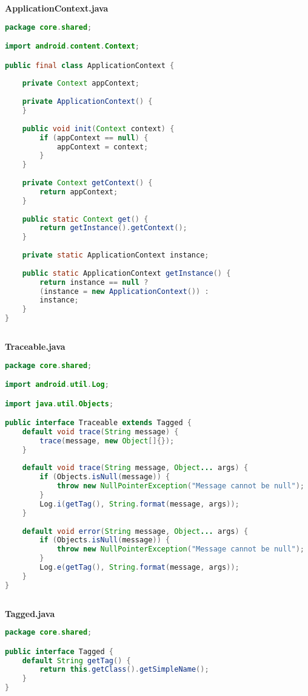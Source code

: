 \textbf{ApplicationContext.java}
\begin{lstlisting}[language=Java]
package core.shared;

import android.content.Context;

public final class ApplicationContext {
	
	private Context appContext;
	
	private ApplicationContext() {
	}
	
	public void init(Context context) {
		if (appContext == null) {
			appContext = context;
		}
	}
	
	private Context getContext() {
		return appContext;
	}
	
	public static Context get() {
		return getInstance().getContext();
	}
	
	private static ApplicationContext instance;
	
	public static ApplicationContext getInstance() {
		return instance == null ?
		(instance = new ApplicationContext()) :
		instance;
	}
}
	
\end{lstlisting}

\textbf{Traceable.java}
\begin{lstlisting}[language=Java]
package core.shared;

import android.util.Log;

import java.util.Objects;

public interface Traceable extends Tagged {
	default void trace(String message) {
		trace(message, new Object[]{});
	}
	
	default void trace(String message, Object... args) {
		if (Objects.isNull(message)) {
			throw new NullPointerException("Message cannot be null");
		}
		Log.i(getTag(), String.format(message, args));
	}
	
	default void error(String message, Object... args) {
		if (Objects.isNull(message)) {
			throw new NullPointerException("Message cannot be null");
		}
		Log.e(getTag(), String.format(message, args));
	}
}
	
\end{lstlisting}

\textbf{Tagged.java}
\begin{lstlisting}[language=Java]
package core.shared;

public interface Tagged {
	default String getTag() {
		return this.getClass().getSimpleName();
	}
}	
\end{lstlisting}

